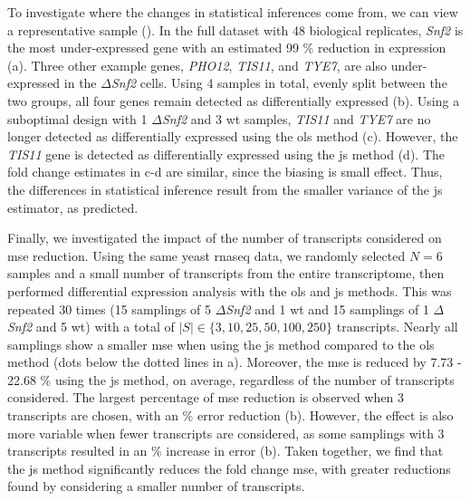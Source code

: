 To investigate where the changes in statistical inferences come from, we can view a representative sample ().
In the full dataset with 48 biological replicates, \emph{Snf2} is the most under-expressed gene with an estimated 99 \% reduction in expression (a).
Three other example genes, \emph{PHO12}, \emph{TIS11}, and \emph{TYE7}, are also under-expressed in the $\Delta$\emph{Snf2} cells.
Using 4 samples in total, evenly split between the two groups, all four genes remain detected as differentially expressed (b).
Using a suboptimal design with 1 $\Delta$\emph{Snf2} and 3 \gls{wt} samples, \emph{TIS11} and \emph{TYE7} are no longer detected as differentially expressed using the \gls{ols} method (c).
However, the \emph{TIS11} gene is detected as differentially expressed using the \gls{js} method (d).
The fold change estimates in c-d are similar, since the biasing is small effect.
Thus, the differences in statistical inference result from the smaller variance of the \gls{js} estimator, as predicted.


Finally, we investigated the impact of the number of transcripts considered on \gls{mse} reduction.
Using the same yeast \gls{rnaseq} data, we randomly selected $N = 6$ samples and a small number of transcripts from the entire transcriptome, then performed differential expression analysis with the \gls{ols} and \gls{js} methods.
This was repeated 30 times (15 samplings of 5 $\Delta$\emph{Snf2} and 1 \gls{wt} and 15 samplings of 1 $\Delta$\emph{Snf2} and 5 \gls{wt}) with a total of $|S| \in \{ 3, 10, 25, 50, 100, 250 \}$ transcripts.
Nearly all samplings show a smaller \gls{mse} when using the \gls{js} method compared to the \gls{ols} method (dots below the dotted lines in a).
Moreover, the \gls{mse} is reduced by 7.73 - 22.68 \% using the \gls{js} method, on average, regardless of the number of transcripts considered.
The largest percentage of \gls{mse} reduction is observed when 3 transcripts are chosen, with an  \% error reduction (b).
However, the effect is also more variable when fewer transcripts are considered, as some samplings with 3 transcripts resulted in an  \% increase in error (b).
Taken together, we find that the \gls{js} method significantly reduces the fold change \gls{mse}, with greater reductions found by considering a smaller number of transcripts.

